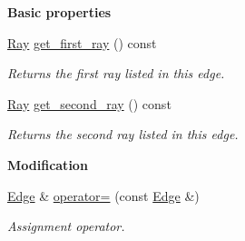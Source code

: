 \begin{Indent}\textbf{ Basic properties}\par
\begin{DoxyCompactItemize}
\item 
\mbox{\label{group___c_l_s_solvers_a42bdb7c77776fcdd004ccc116dad062c}} 
\hyperlink{group___c_l_s_solvers_class_l_p___solvers_1_1_ray}{Ray} \hyperlink{group___c_l_s_solvers_a42bdb7c77776fcdd004ccc116dad062c}{get\+\_\+first\+\_\+ray} () const
\begin{DoxyCompactList}\small\item\em Returns the first ray listed in this edge. \end{DoxyCompactList}\item 
\mbox{\label{group___c_l_s_solvers_a9d370c22d17a71e588e1e7f55dd92546}} 
\hyperlink{group___c_l_s_solvers_class_l_p___solvers_1_1_ray}{Ray} \hyperlink{group___c_l_s_solvers_a9d370c22d17a71e588e1e7f55dd92546}{get\+\_\+second\+\_\+ray} () const
\begin{DoxyCompactList}\small\item\em Returns the second ray listed in this edge. \end{DoxyCompactList}\end{DoxyCompactItemize}
\end{Indent}
\begin{Indent}\textbf{ Modification}\par
\begin{DoxyCompactItemize}
\item 
\mbox{\label{group___c_l_s_solvers_a61244022cf65ac1c5cb9d11377985bc8}} 
\hyperlink{group___c_l_s_solvers_class_l_p___solvers_1_1_edge}{Edge} \& \hyperlink{group___c_l_s_solvers_a61244022cf65ac1c5cb9d11377985bc8}{operator=} (const \hyperlink{group___c_l_s_solvers_class_l_p___solvers_1_1_edge}{Edge} \&)
\begin{DoxyCompactList}\small\item\em Assignment operator. \end{DoxyCompactList}\end{DoxyCompactItemize}
\end{Indent}
